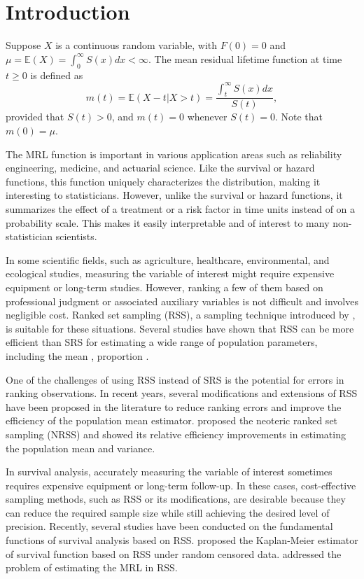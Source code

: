 \documentclass[twoside]{article}
\begin{document}
\section{Introduction}
Suppose $X$ is a continuous random variable, with $F \left(0\right) =0$ and $\mu= \mathbb{E}\left( X \right)=\int_{0}^{\infty }S\left( x \right)dx< \infty $. The mean residual lifetime function at time
$t\geq0$ is defined as 
\begin{equation}
	m(t)=\mathbb{E}\left(X-t|X>t\right)=\frac{{\int_{t}^{\infty}{S(x)dx}}}{{S(t)}},\label{eq_m}
\end{equation}
provided that $S(t)>0$, and $m\left(t\right)=0$ whenever $S\left(t\right)=0$. Note that $m\left(0\right)=\mu$.

The MRL function is important in various application areas such as reliability engineering, medicine, and actuarial science. Like the survival or hazard functions, this function uniquely characterizes the distribution, making it interesting to statisticians. However, unlike the survival or hazard functions, it summarizes the effect of a treatment or a risk factor in time units instead of on a probability scale. This makes it easily interpretable and of interest to many non-statistician scientists.

In some scientific fields, such as agriculture, healthcare, environmental, and ecological studies, measuring the variable of interest might require expensive equipment or long-term studies. However, ranking a few of them based on professional judgment or associated auxiliary variables is not difficult and involves negligible cost. Ranked set sampling (RSS), a sampling technique introduced by \cite{McIntyre(1952)}, is suitable for these situations. Several studies have shown that RSS can be more efficient than SRS for estimating a wide range
of population parameters, including the mean \citep{Frey2012}, proportion \citep{Zamanzade2020}. 

One of the challenges of using RSS instead of SRS is the potential for errors in ranking observations.
In recent years, several modifications and extensions of RSS have been proposed in the
literature to reduce ranking errors and improve the efficiency of the population mean estimator.  \cite{Zamanzade2016} proposed the neoteric ranked set sampling (NRSS) and showed its relative efficiency improvements in estimating the population mean and variance.

In survival analysis, accurately measuring the variable of interest sometimes requires expensive
equipment or long-term follow-up. In these cases, cost-effective sampling methods, such as RSS
or its modifications, are desirable because they can reduce the required sample size while still
achieving the desired level of precision. Recently, several studies have been conducted on the
fundamental functions of survival analysis based on RSS.  \cite{Strzalkowska2014}  proposed the Kaplan-Meier estimator of survival function based on RSS
under random censored data. \cite{Zamanzade2019} addressed the problem of estimating
the MRL in RSS.
\end{document}
